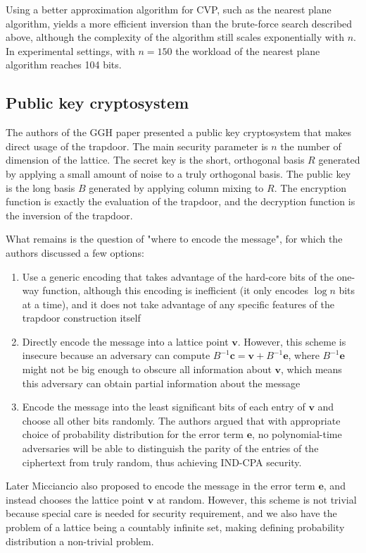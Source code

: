 \documentclass[letterpaper,12pt]{article}
\begin{document}
Using a better approximation algorithm for CVP, such as the nearest plane algorithm, yields a more efficient inversion than the brute-force search described above, although the complexity of the algorithm still scales exponentially with $n$. In experimental settings, with $n=150$ the workload of the nearest plane algorithm reaches 104 bits.

\subsection{Public key cryptosystem}
The authors of the GGH paper presented a public key cryptosystem that makes direct usage of the trapdoor. The main security parameter is $n$ the number of dimension of the lattice. The secret key is the short, orthogonal basis $R$ generated by applying a small amount of noise to a truly orthogonal basis. The public key is the long basis $B$ generated by applying column mixing to $R$. The encryption function is exactly the evaluation of the trapdoor, and the decryption function is the inversion of the trapdoor.

What remains is the question of "where to encode the message", for which the authors discussed a few options:

\begin{enumerate}
    \item Use a generic encoding that takes advantage of the hard-core bits of the one-way function, although this encoding is inefficient (it only encodes $\log{n}$ bits at a time), and it does not take advantage of any specific features of the trapdoor construction itself
    \item Directly encode the message into a lattice point $\mathbf{v}$. However, this scheme is insecure because an adversary can compute $B^{-1}\mathbf{c} = \mathbf{v} + B^{-1}\mathbf{e}$, where $B^{-1}\mathbf{e}$ might not be big enough to obscure all information about $\mathbf{v}$, which means this adversary can obtain partial information about the message
    \item Encode the message into the least significant bits of each entry of $\mathbf{v}$ and choose all other bits randomly. The authors argued that with appropriate choice of probability distribution for the error term $\mathbf{e}$, no polynomial-time adversaries will be able to distinguish the parity of the entries of the ciphertext from truly random, thus achieving IND-CPA security.
\end{enumerate}

Later Micciancio also proposed to encode the message in the error term $\mathbf{e}$, and instead chooses the lattice point $\mathbf{v}$ at random. However, this scheme is not trivial because special care is needed for security requirement, and we also have the problem of a lattice being a countably infinite set, making defining probability distribution a non-trivial problem.
\end{document}
